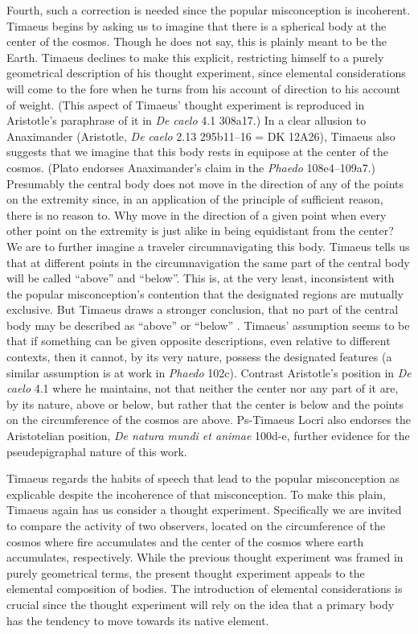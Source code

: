 Fourth, such a correction is needed since the popular misconception is incoherent. Timaeus begins by asking us to imagine that there is a spherical body at the center of the cosmos. Though he does not say, this is plainly meant to be the Earth. Timaeus declines to make this explicit, restricting himself to a purely geometrical description of his thought experiment, since elemental considerations will come to the fore when he turns from his account of direction to his account of weight. (This aspect of Timaeus' thought experiment is reproduced in Aristotle's paraphrase of it in \emph{De caelo} 4.1 308a17.) In a clear allusion to Anaximander (Aristotle, \emph{De caelo} 2.13 295b11--16 = DK 12A26), Timaeus also suggests that we imagine that this body rests in equipose at the center of the cosmos. (Plato endorses Anaximander's claim in the \emph{Phaedo} 108e4--109a7.) Presumably the central body does not move in the direction of any of the points on the extremity since, in an application of the principle of sufficient reason, there is no reason to. Why move in the direction of a given point when every other point on the extremity is just alike in being equidistant from the center? We are to further imagine a traveler circumnavigating this body. Timaeus tells us that at different points in the circumnavigation the same part of the central body will be called ``above'' and ``below''. This is, at the very least, inconsistent with the popular misconception's contention that the designated regions are mutually exclusive. But Timaeus draws a stronger conclusion, that no part of the central body may be described as ``above'' or ``below'' \citep[23--24]{OBrien:1984ji}. Timaeus' assumption seems to be that if something can be given opposite descriptions, even relative to different contexts, then it cannot, by its very nature, possess the designated features (a similar assumption is at work in \emph{Phaedo} 102c). Contrast Aristotle's position in \emph{De caelo} 4.1 where he maintains, not that neither the center nor any part of it are, by its nature, above or below, but rather that the center is below and the points on the circumference of the cosmos are above. Ps-Timaeus Locri also endorses the Aristotelian position, \emph{De natura mundi et animae} 100d-e, further evidence for the pseudepigraphal nature of this work.

Timaeus regards the habits of speech that lead to the popular misconception as explicable despite the incoherence of that misconception. To make this plain, Timaeus again has us consider a thought experiment. Specifically we are invited to compare the activity of two observers, located on the circumference of the cosmos where fire accumulates and the center of the cosmos where earth accumulates, respectively. While the previous thought experiment was framed in purely geometrical terms, the present thought experiment appeals to the elemental composition of bodies. The introduction of elemental considerations is crucial since the thought experiment will rely on the idea that a primary body has the tendency to move towards its native element.

